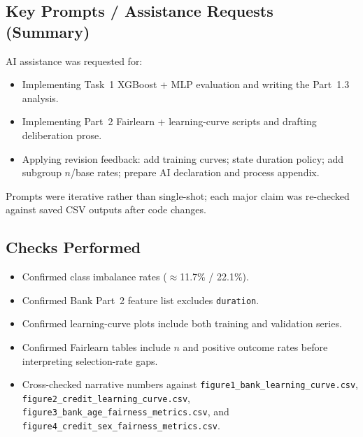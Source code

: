 \documentclass[11pt,a4paper]{article}
\begin{document}
\subsection{Key Prompts / Assistance Requests (Summary)}
AI assistance was requested for:
\begin{itemize}
    \item Implementing Task~1 XGBoost + MLP evaluation and writing the Part~1.3 analysis.
    \item Implementing Part~2 Fairlearn + learning-curve scripts and drafting deliberation
    prose.
    \item Applying revision feedback: add training curves; state duration policy; add
    subgroup $n$/base rates; prepare AI declaration and process appendix.
\end{itemize}
Prompts were iterative rather than single-shot; each major claim was re-checked against
saved CSV outputs after code changes.

\subsection{Checks Performed}
\begin{itemize}
    \item Confirmed class imbalance rates ($\approx$11.7\% / 22.1\%).
    \item Confirmed Bank Part~2 feature list excludes \texttt{duration}.
    \item Confirmed learning-curve plots include both training and validation series.
    \item Confirmed Fairlearn tables include $n$ and positive outcome rates before
    interpreting selection-rate gaps.
    \item Cross-checked narrative numbers against
    \texttt{figure1\_bank\_learning\_curve.csv},
    \texttt{figure2\_credit\_learning\_curve.csv},
    \texttt{figure3\_bank\_age\_fairness\_metrics.csv}, and
    \texttt{figure4\_credit\_sex\_fairness\_metrics.csv}.
\end{itemize}
\end{document}
